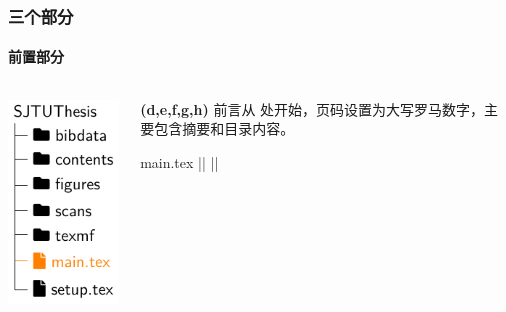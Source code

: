 \begin{frame}[fragile]
  \frametitle{三个部分}
  \framesubtitle{前置部分}
  \begin{columns}
    \begin{column}{0.4\textwidth}
      \includegraphics[page=8]{support/figures/thesisdir.pdf}
    \end{column}
    \begin{column}{0.6\textwidth}
      \alert{\textbf{(d,e,f,g,h)}} 前言从  处开始，页码设置为大写罗马数字，主要包含摘要和目录内容。
      \begin{codeblock}[firstnumber=27]{main.tex}
|\highlightline|%
|\highlightline|\frontmatter



\tableofcontents
      \end{codeblock}
    \end{column}
  \end{columns}
\end{frame}

